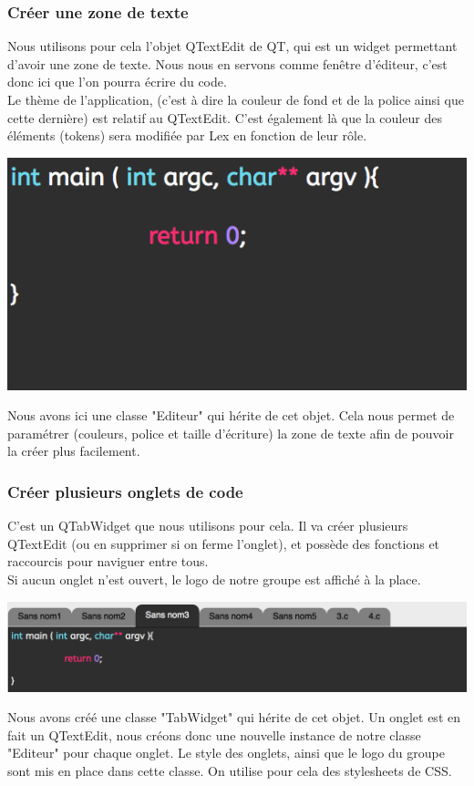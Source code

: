 \documentclass[a4paper,12pt]{article}
\begin{document}
			\subsubsection*{Créer une zone de texte}
			 Nous utilisons pour cela l'objet QTextEdit de QT, qui est un widget permettant d'avoir une zone de texte. Nous nous en servons comme fenêtre d'éditeur, c'est donc ici que l'on pourra écrire du code.\\
			Le thème de l'application, (c'est à dire la couleur de fond et de la police ainsi que cette dernière) est relatif au QTextEdit. C'est également là que la couleur des éléments (tokens) sera modifiée par Lex en fonction de leur rôle.\\
			\begin{center}
				\includegraphics[scale=0.8]{images/QTextEdit}
				\vspace{0.5cm}
			\end{center}
			Nous avons ici une classe "Editeur" qui hérite de cet objet. Cela nous permet de paramétrer (couleurs, police et taille d'écriture) la zone de texte afin de pouvoir la créer plus facilement.\\
			
			
			\subsubsection*{Créer plusieurs onglets de code}
			 C'est un QTabWidget que nous utilisons pour cela. Il va créer plusieurs QTextEdit (ou en supprimer si on ferme l'onglet), et possède des fonctions et raccourcis pour naviguer entre tous. \\
			Si aucun onglet n'est ouvert, le logo de notre groupe est affiché à la place.\\
			\begin{center}
				\includegraphics[scale=0.6]{images/QTabWidget}
				\vspace{0.5cm}
			\end{center}
			Nous avons créé une classe "TabWidget" qui hérite de cet objet. Un onglet est en fait un QTextEdit, nous créons donc une nouvelle instance de notre classe "Editeur" pour chaque onglet. Le style des onglets, ainsi que le logo du groupe sont mis en place dans cette classe. On utilise pour cela des stylesheets de CSS.\\
			
\end{document}
